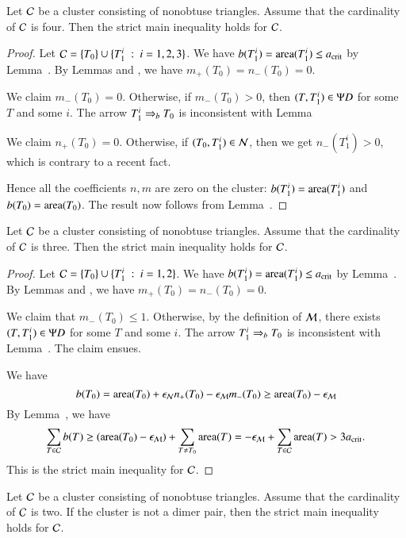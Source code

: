 \begin{lemma}
  Let $\mathcal C$ be a cluster consisting of nonobtuse triangles.  Assume
  that the cardinality of $\mathcal C$ is four.  Then the strict main
  inequality holds for $\mathcal C$.
\end{lemma}

\begin{proof}  
  Let $\mathcal C = \{T_0\}\cup \{T_1^i \ :\  i=1,2,3\}$.  We have $b(T_1^i) =
  {\operatorname{area}}(T_1^i)\le a_\text{crit}$ by Lemma~.  By Lemmas
   and , we have
  $m_+(T_0)=n_-(T_0)=0$.

  We claim $m_-(T_0)=0$.  Otherwise, if $m_-(T_0) >0$, then
  $(T,T_1^i)\in\Psi D$ for some $T$ and some $i$.  The arrow $T_1^i\Rightarrow_{b}
  T_0$ is inconsistent with Lemma~

  We claim $n_+(T_0)=0$.  Otherwise, if $(T_0,T_1^i)\in\mathcal N$, then we
  get $n_-(T_1^i)>0$, which is contrary to a recent fact.

  Hence all the coefficients $n,m$ are zero on the cluster:
  $b(T_1^i)={\operatorname{area}}(T_1^i)$ and $b(T_0) = {\operatorname{area}}(T_0)$.  The result now
  follows from Lemma~.
\end{proof}

\begin{lemma}
  Let $\mathcal C$ be a cluster consisting of nonobtuse triangles.  Assume
  that the cardinality of $\mathcal C$ is three.  Then the strict main
  inequality holds for $\mathcal C$.
\end{lemma}

\begin{proof}  
  Let $\mathcal C = \{T_0\}\cup \{T_1^i \ :\  i=1,2\}$.  We have $b(T_1^i) =
  {\operatorname{area}}(T_1^i)\le a_\text{crit}$ by Lemma~.  By Lemmas
   and , we have
  $m_+(T_0)=n_-(T_0)=0$.

  We claim that $m_-(T_0)\le 1$.  Otherwise, by the definition of
  $\mathcal M$, there exists $(T,T_1^i)\in\Psi D$ for some $T$ and some $i$.  The
  arrow $T_1^i\Rightarrow_{b} T_0$ is inconsistent with Lemma~.
  The claim ensues.

We have
\[
b(T_0) = {\operatorname{area}}(T_0) + \epsilon_{\mathcal N} n_+(T_0) - \epsilon_{\mathcal M} m_-(T_0) 
\ge {\operatorname{area}}(T_0) - \epsilon_{\mathcal M}
\]
By Lemma~, we have
\[
\sum_{T\in\mathcal C} b(T) \ge ({\operatorname{area}}(T_0) - \epsilon_{\mathcal M}) + \sum_{T\ne T_0} {\operatorname{area}}(T) 
= -\epsilon_{\mathcal M}+ \sum_{T\in\mathcal C} {\operatorname{area}}(T) > 3a_\text{crit}.
\]
This is the strict main inequality for $\mathcal C$.
\end{proof}

\begin{lemma} 
  Let $\mathcal C$ be a cluster consisting of nonobtuse triangles.  Assume
  that the cardinality of $\mathcal C$ is two.  If the cluster is not a dimer
  pair, then the strict main inequality holds for $\mathcal C$.
\end{lemma}

